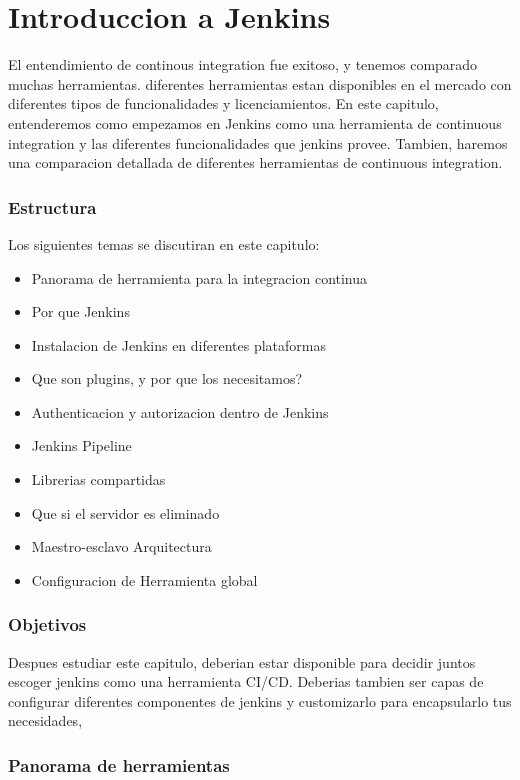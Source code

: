 \chapter{Introduccion a Jenkins}
El entendimiento de continous integration fue exitoso, y tenemos comparado muchas herramientas. diferentes herramientas estan disponibles en el mercado con diferentes tipos de funcionalidades y licenciamientos. En este capitulo, entenderemos como empezamos en Jenkins como una herramienta de continuous integration y las diferentes funcionalidades que jenkins provee. Tambien, haremos una comparacion detallada de diferentes herramientas de continuous integration.
\subsection*{Estructura}
Los siguientes temas se discutiran en este capitulo:
\begin{itemize}
  \item Panorama de herramienta para la integracion continua
  \item Por que Jenkins
  \item Instalacion de Jenkins en diferentes plataformas
  \item Que son plugins, y por que los necesitamos?
  \item Authenticacion y autorizacion dentro de Jenkins
  \item Jenkins Pipeline
  \item Librerias compartidas
  \item Que si el servidor es eliminado
  \item Maestro-esclavo Arquitectura
  \item Configuracion de Herramienta global
\end{itemize}
\subsection*{Objetivos}
Despues estudiar este capitulo, deberian estar disponible para decidir juntos escoger jenkins como una herramienta CI/CD. Deberias tambien ser capas de configurar diferentes componentes de jenkins y customizarlo para encapsularlo tus necesidades, 
\subsection{Panorama de herramientas}

